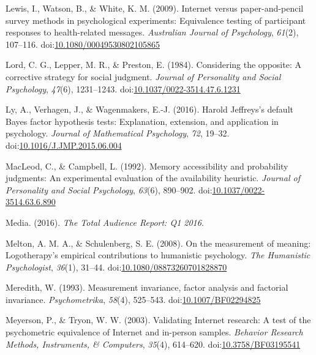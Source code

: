 \documentclass[english,man]{apa6}
\theoremstyle{definition}
\theoremstyle{definition}
\theoremstyle{definition}
\theoremstyle{remark}
\begin{document}
\hypertarget{ref-Lewis2009}{}
Lewis, I., Watson, B., \& White, K. M. (2009). Internet versus
paper-and-pencil survey methods in psychological experiments:
Equivalence testing of participant responses to health-related messages.
\emph{Australian Journal of Psychology}, \emph{61}(2), 107--116.
doi:\href{https://doi.org/10.1080/00049530802105865}{10.1080/00049530802105865}

\hypertarget{ref-Lord1984}{}
Lord, C. G., Lepper, M. R., \& Preston, E. (1984). Considering the
opposite: A corrective strategy for social judgment. \emph{Journal of
Personality and Social Psychology}, \emph{47}(6), 1231--1243.
doi:\href{https://doi.org/10.1037/0022-3514.47.6.1231}{10.1037/0022-3514.47.6.1231}

\hypertarget{ref-Ly2016}{}
Ly, A., Verhagen, J., \& Wagenmakers, E.-J. (2016). Harold Jeffreys's
default Bayes factor hypothesis tests: Explanation, extension, and
application in psychology. \emph{Journal of Mathematical Psychology},
\emph{72}, 19--32.
doi:\href{https://doi.org/10.1016/J.JMP.2015.06.004}{10.1016/J.JMP.2015.06.004}

\hypertarget{ref-MacLeod1992}{}
MacLeod, C., \& Campbell, L. (1992). Memory accessibility and
probability judgments: An experimental evaluation of the availability
heuristic. \emph{Journal of Personality and Social Psychology},
\emph{63}(6), 890--902.
doi:\href{https://doi.org/10.1037/0022-3514.63.6.890}{10.1037/0022-3514.63.6.890}

\hypertarget{ref-Media2016}{}
Media. (2016). \emph{The Total Audience Report: Q1 2016}.

\hypertarget{ref-Melton2008}{}
Melton, A. M. A., \& Schulenberg, S. E. (2008). On the measurement of
meaning: Logotherapy's empirical contributions to humanistic psychology.
\emph{The Humanistic Psychologist}, \emph{36}(1), 31--44.
doi:\href{https://doi.org/10.1080/08873260701828870}{10.1080/08873260701828870}

\hypertarget{ref-Meredith1993}{}
Meredith, W. (1993). Measurement invariance, factor analysis and
factorial invariance. \emph{Psychometrika}, \emph{58}(4), 525--543.
doi:\href{https://doi.org/10.1007/BF02294825}{10.1007/BF02294825}

\hypertarget{ref-Meyerson2003}{}
Meyerson, P., \& Tryon, W. W. (2003). Validating Internet research: A
test of the psychometric equivalence of Internet and in-person samples.
\emph{Behavior Research Methods, Instruments, \& Computers},
\emph{35}(4), 614--620.
doi:\href{https://doi.org/10.3758/BF03195541}{10.3758/BF03195541}
\end{document}
